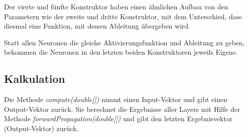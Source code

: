 \documentclass[paper=A4,pagesize=auto,12pt,headinclude=true,footinclude=true,BCOR=0mm,DIV=calc]{scrartcl}
\begin{document}
	Der vierte und fünfte Konstruktor haben einen ähnlichen Aufbau von den Parametern wie der zweite und dritte Konstruktor, mit dem Unterschied, dass diesmal eine Funktion, mit dessen Ableitung übergeben wird.
	
	Statt allen Neuronen die gleiche Aktivierungsfunktion und Ableitung zu geben, bekommen die Neuronen in den letzten beiden Konstruktoren jeweils Eigene.
	
	
	\subsection{Kalkulation}
	Die Methode \textit{compute(double[])} nimmt einen Input-Vektor und gibt einen Output-Vektor zurück. Sie berechnet die Ergebnisse aller Layers mit Hilfe der Methode \textit{forwardPropagation(double[])} und gibt den letzten Ergebnisvektor (Output-Vektor) zurück.
	
\end{document}
